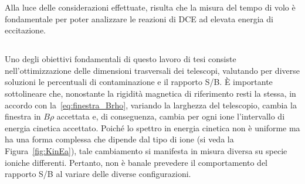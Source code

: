 Alla luce delle considerazioni effettuate, risulta che la misura del tempo di volo è fondamentale per poter analizzare le reazioni di DCE ad elevata energia di eccitazione.



 


\subsection{}

Uno degli obiettivi fondamentali di questo lavoro di tesi consiste nell'ottimizzazione delle dimensioni trasversali dei telescopi, valutando per diverse soluzioni le percentuali di contaminazione e il rapporto S/B.
È importante sottolineare che, nonostante la rigidità magnetica di riferimento resti la stessa, in accordo con la~\ref{eq:finestra_Brho}, variando la larghezza del telescopio, cambia la finestra in $B \rho$ accettata e, di conseguenza, cambia per ogni ione l'intervallo di energia cinetica accettato.
Poiché lo spettro in energia cinetica non è uniforme ma ha una forma complessa che dipende dal tipo di ione (si veda la Figura~\ref{fig:KinEa}), tale cambiamento si manifesta in misura diversa su specie ioniche differenti.
Pertanto, non è banale prevedere il comportamento del rapporto S/B al variare delle diverse configurazioni.

